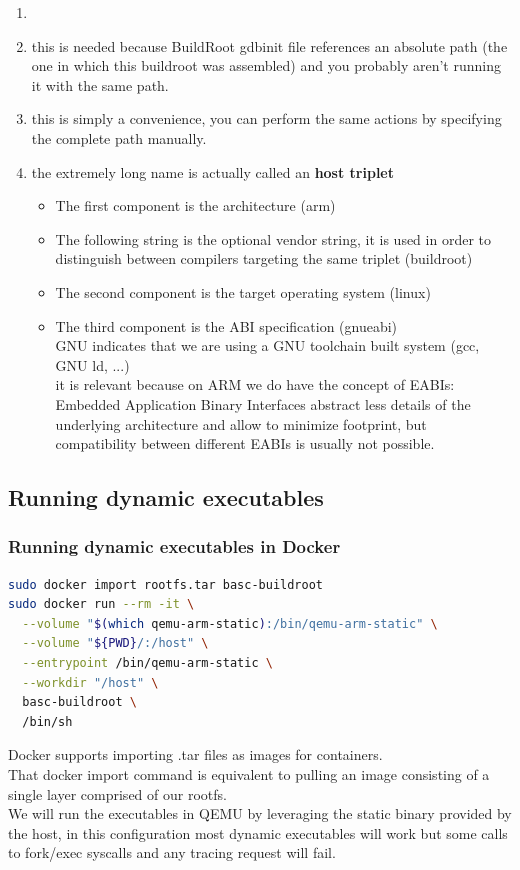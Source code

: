  {
  \begin{enumerate}
    \item 
    \item this is needed because BuildRoot gdbinit file references an absolute path (the one in which this buildroot was assembled)
      and you probably aren't running it with the same path.
    \item this is simply a convenience, you can perform the same actions by specifying the complete path manually.
    \item the extremely long name is actually called an \textbf{host triplet}
    \begin{itemize}
      \item The first component is the architecture (arm)
      \item The following string is the optional vendor string,
        it is used in order to distinguish between compilers targeting the same triplet (buildroot)
      \item The second component is the target operating system (linux)
      \item The third component is the ABI specification (gnueabi) \\
        GNU indicates that we are using a GNU toolchain built system (gcc, GNU ld, ...) \\
        it is relevant because on ARM we do have the concept of EABIs: \\
        Embedded Application Binary Interfaces abstract less details of the underlying architecture and allow 
        to minimize footprint, but compatibility between different EABIs is usually not possible.
    \end{itemize}
  \end{enumerate}
}

\subsection{Running dynamic executables}
\begin{frame}[fragile]
  \frametitle{Running dynamic executables in Docker}
  \begin{lstlisting}[language=sh]
sudo docker import rootfs.tar basc-buildroot
sudo docker run --rm -it \
  --volume "$(which qemu-arm-static):/bin/qemu-arm-static" \
  --volume "${PWD}/:/host" \
  --entrypoint /bin/qemu-arm-static \
  --workdir "/host" \
  basc-buildroot \
  /bin/sh
  \end{lstlisting}
\end{frame}
\only<handout> {
  Docker supports importing .tar files as images for containers. \\
  That docker import command is equivalent to pulling an image consisting of a single layer comprised of our rootfs. \\
  We will run the executables in QEMU by leveraging the static binary provided by the host, in this configuration
  most dynamic executables will work but some calls to fork/exec syscalls and any tracing request will fail.
}

